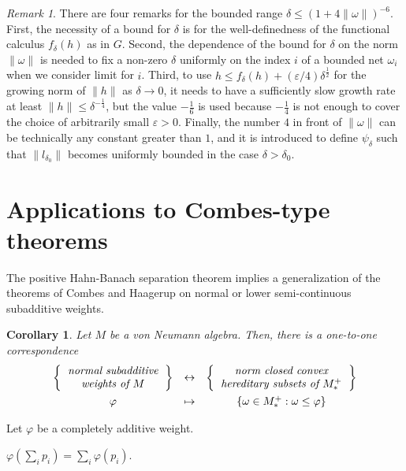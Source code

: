 \documentclass[noamsfonts,a4paper,10pt]{amsart}
\theoremstyle{plain}
\newtheorem{cor}[thm]{Corollary}
\theoremstyle{definition}
\theoremstyle{remark}
\newtheorem{rmk}[thm]{Remark}
\begin{document}
\begin{rmk}
There are four remarks for the bounded range $\delta\le(1+4\|\omega\|)^{-6}$.
First, the necessity of a bound for $\delta$ is for the well-definedness of the functional calculus $f_\delta(h)$ as in $G$.
Second, the dependence of the bound for $\delta$ on the norm $\|\omega\|$ is needed to fix a non-zero $\delta$ uniformly on the index $i$ of a bounded net $\omega_i$ when we consider limit for $i$.
Third, to use $h\le f_\delta(h)+(\varepsilon/4)\delta^{\frac12}$ for the growing norm of $\|h\|$ as $\delta\to0$, it needs to have a sufficiently slow growth rate at least $\|h\|\le\delta^{-\frac14}$, but the value $-\frac16$ is used because $-\frac14$ is not enough to cover the choice of arbitrarily small $\varepsilon>0$.
Finally, the number $4$ in front of $\|\omega\|$ can be technically any constant greater than $1$, and it is introduced to define $\psi_\delta$ such that $\|l_{\delta_0}\|$ becomes uniformly bounded in the case $\delta>\delta_0$.



\end{rmk}


\iffalse
\section{Applications to Combes-type theorems}


The positive Hahn-Banach separation theorem implies a generalization of the theorems of Combes and Haagerup on normal or lower semi-continuous subadditive weights.
\begin{cor}
Let $M$ be a von Neumann algebra.
Then, there is a one-to-one correspondence
\[\begin{array}{ccc}
\left\{\emph{\begin{tabular}{c}normal subadditive\\weights of $M$\end{tabular}}\right\}&\leftrightarrow&\left\{\emph{\begin{tabular}{c}norm closed convex\\hereditary subsets of $M_*^+$\end{tabular}}\right\}\\[10pt]
\varphi&\mapsto&\{\omega\in M_*^+:\omega\le\varphi\}
\end{array}\]
\end{cor}


Let $\varphi$ be a completely additive weight.

$\varphi(\sum_ip_i)=\sum_i\varphi(p_i)$.
\end{document}
